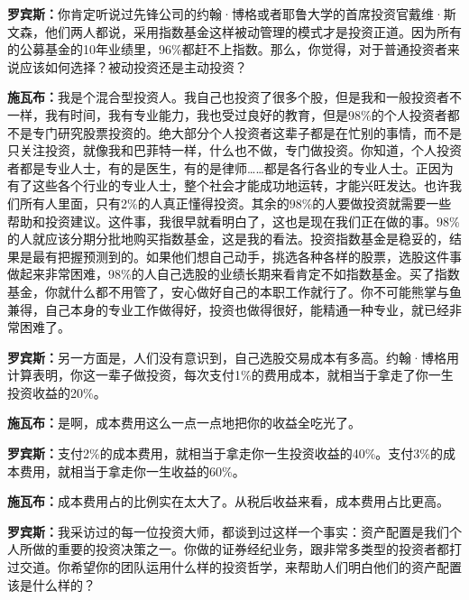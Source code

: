 \begin{BookQuote}
\textbf{罗宾斯：}你肯定听说过先锋公司的约翰·博格或者耶鲁大学的首席投资官戴维·斯文森，他们两人都说，采用指数基金这样被动管理的模式才是投资正道。因为所有的公募基金的10年业绩里，96\%都赶不上指数。那么，你觉得，对于普通投资者来说应该如何选择？被动投资还是主动投资？
\end{BookQuote}

\begin{BookQuote}
\textbf{施瓦布：}我是个混合型投资人。我自己也投资了很多个股，但是我和一般投资者不一样，我有时间，我有专业能力，我也受过良好的教育，但是98\%的个人投资者都不是专门研究股票投资的。绝大部分个人投资者这辈子都是在忙别的事情，而不是只关注投资，就像我和巴菲特一样，什么也不做，专门做投资。你知道，个人投资者都是专业人士，有的是医生，有的是律师……都是各行各业的专业人士。正因为有了这些各个行业的专业人士，整个社会才能成功地运转，才能兴旺发达。也许我们所有人里面，只有2\%的人真正懂得投资。其余的98\%的人要做投资就需要一些帮助和投资建议。这件事，我很早就看明白了，这也是现在我们正在做的事。98\%的人就应该分期分批地购买指数基金，这是我的看法。投资指数基金是稳妥的，结果是最有把握预测到的。如果他们想自己动手，挑选各种各样的股票，选股这件事做起来非常困难，98\%的人自己选股的业绩长期来看肯定不如指数基金。买了指数基金，你就什么都不用管了，安心做好自己的本职工作就行了。你不可能熊掌与鱼兼得，自己本身的专业工作做得好，投资也做得很好，能精通一种专业，就已经非常困难了。
\end{BookQuote}

\begin{BookQuote}
\textbf{罗宾斯：}另一方面是，人们没有意识到，自己选股交易成本有多高。约翰·博格用计算表明，你这一辈子做投资，每次支付1\%的费用成本，就相当于拿走了你一生投资收益的20\%。
\end{BookQuote}

\begin{BookQuote}
\textbf{施瓦布：}是啊，成本费用这么一点一点地把你的收益全吃光了。
\end{BookQuote}

\begin{BookQuote}
\textbf{罗宾斯：}支付2\%的成本费用，就相当于拿走你一生投资收益的40\%。支付3\%的成本费用，就相当于拿走你一生收益的60\%。
\end{BookQuote}

\begin{BookQuote}
\textbf{施瓦布：}成本费用占的比例实在太大了。从税后收益来看，成本费用占比更高。
\end{BookQuote}

\begin{BookQuote}
\textbf{罗宾斯：}我采访过的每一位投资大师，都谈到过这样一个事实：资产配置是我们个人所做的重要的投资决策之一。你做的证券经纪业务，跟非常多类型的投资者都打过交道。你希望你的团队运用什么样的投资哲学，来帮助人们明白他们的资产配置该是什么样的？
\end{BookQuote}

